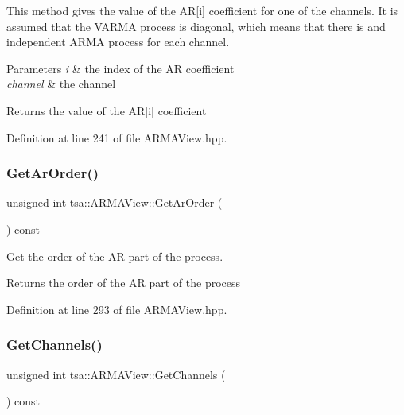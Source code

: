 This method gives the value of the AR\mbox{[}i\mbox{]} coefficient for one of the channels. It is assumed that the V\+A\+R\+MA process is diagonal, which means that there is and independent A\+R\+MA process for each channel.


\begin{DoxyParams}{Parameters}
{\em i} & the index of the AR coefficient \\
\hline
{\em channel} & the channel\\
\hline
\end{DoxyParams}
\begin{DoxyReturn}{Returns}
the value of the AR\mbox{[}i\mbox{]} coefficient 
\end{DoxyReturn}


Definition at line 241 of file A\+R\+M\+A\+View.\+hpp.

\mbox{\label{classtsa_1_1_a_r_m_a_view_a022eacefccd6be3b5efa36b656295206}} 
\subsubsection{\texorpdfstring{Get\+Ar\+Order()}{GetArOrder()}}
{\footnotesize\ttfamily unsigned int tsa\+::\+A\+R\+M\+A\+View\+::\+Get\+Ar\+Order (\begin{DoxyParamCaption}{ }\end{DoxyParamCaption}) const\hspace{0.3cm}{\ttfamily [inline]}}

Get the order of the AR part of the process.

\begin{DoxyReturn}{Returns}
the order of the AR part of the process 
\end{DoxyReturn}


Definition at line 293 of file A\+R\+M\+A\+View.\+hpp.

\mbox{\label{classtsa_1_1_a_r_m_a_view_a9a45f52a936aa86414c5afb43592f98e}} 
\subsubsection{\texorpdfstring{Get\+Channels()}{GetChannels()}}
{\footnotesize\ttfamily unsigned int tsa\+::\+A\+R\+M\+A\+View\+::\+Get\+Channels (\begin{DoxyParamCaption}{ }\end{DoxyParamCaption}) const\hspace{0.3cm}{\ttfamily [inline]}}

